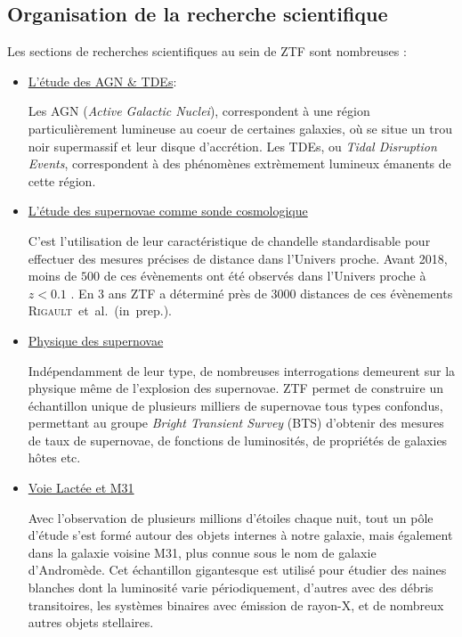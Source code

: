 \documentclass[../main/main.tex]{subfiles}
\begin{document}
\subsection{Organisation de la recherche scientifique}

Les sections de recherches scientifiques au sein de ZTF sont nombreuses \citep{GrahamZTF2019}:

\begin{itemize}[label=$\bullet$]
\setlength\itemsep{1em}
    \item \underline{L'étude des AGN \& TDEs}:
  
      Les AGN (\textit{Active Galactic Nuclei}), correspondent à une
      région particulièrement lumineuse au coeur de certaines galaxies,
      où se situe un trou noir
      supermassif et leur disque d'accrétion. Les TDEs, ou \textit{Tidal Disruption Events}, correspondent à des
      phénomènes extrèmement lumineux émanents de cette région.

    \item \underline{L'étude des supernovae comme sonde cosmologique}
      
      C'est l'utilisation de leur caractéristique de chandelle standardisable pour
      effectuer des mesures précises de distance dans l'Univers
      proche. Avant 2018, moins de $500$ de ces évènements ont
      été observés dans l'Univers proche à $z<0.1$ \citep{Scolnicpantheon21}. En 3 ans ZTF a déterminé près
      de $3000$ distances de ces évènements \mbox{\textsc{Rigault} et al. (in prep.)}.

    \item \underline{Physique des supernovae}

      Indépendamment de leur type, de nombreuses interrogations demeurent sur la
      physique même de l'explosion des supernovae. ZTF permet de construire
      un échantillon unique de plusieurs milliers de supernovae tous
      types confondus, permettant au groupe \textit{Bright Transient Survey}
      (BTS) d'obtenir des mesures de taux de supernovae, de fonctions de
      luminosités, de propriétés de galaxies hôtes etc.

    \item \underline{Voie Lactée et M31}

      Avec l'observation de plusieurs millions d'étoiles chaque nuit, tout un
      pôle d'étude s'est formé autour des objets internes à notre
      galaxie, mais également dans la galaxie voisine M31, plus connue
      sous le nom de galaxie d'Andromède. Cet échantillon gigantesque est utilisé pour étudier
      des naines blanches dont la luminosité varie périodiquement,
      d'autres avec des débris transitoires, les systèmes binaires avec
      émission de rayon-X, et de nombreux autres objets stellaires.



\end{itemize}
\end{document}
